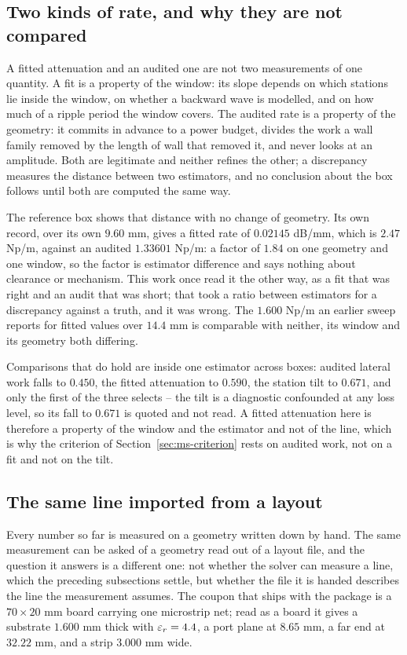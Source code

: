 \subsection{Two kinds of rate, and why they are not compared}
\label{sec:msres-estimators}

A fitted attenuation and an audited one are not two measurements of one quantity. A fit is a property of the
window: its slope depends on which stations lie inside the window, on whether a backward wave is modelled, and on
how much of a ripple period the window covers. The audited rate is a property of the geometry: it commits in
advance to a power budget, divides the work a wall family removed by the length of wall that removed it, and
never looks at an amplitude. Both are legitimate and neither refines the other; a discrepancy measures the
distance between two estimators, and no conclusion about the box follows until both are computed the same way.

The reference box shows that distance with no change of geometry. Its own record, over its own $9.60$ mm, gives a
fitted rate of $0.02145$ dB/mm, which is $2.47$ Np/m, against an audited $1.33601$ Np/m: a factor of $1.84$ on
one geometry and one window, so the factor is estimator difference and says nothing about clearance or mechanism.
This work once read it the other way, as a fit that was right and an audit that was short; that took a ratio
between estimators for a discrepancy against a truth, and it was wrong. The $1.600$ Np/m an earlier sweep reports
for fitted values over $14.4$ mm is comparable with neither, its window and its geometry both differing.

Comparisons that do hold are inside one estimator across boxes: audited lateral work falls to $0.450$, the fitted
attenuation to $0.590$, the station tilt to $0.671$, and only the first of the three selects -- the tilt is a
diagnostic confounded at any loss level, so its fall to $0.671$ is quoted and not read. A fitted attenuation
here is therefore a property of the window and the estimator and not of the line, which is why the criterion of
Section~\ref{sec:ms-criterion} rests on audited work, not on a fit and not on the tilt.

\subsection{The same line imported from a layout}
\label{sec:msres-import}

Every number so far is measured on a geometry written down by hand. The same measurement can be asked of a
geometry read out of a layout file, and the question it answers is a different one: not whether the solver can
measure a line, which the preceding subsections settle, but whether the file it is handed describes the line the
measurement assumes. The coupon that ships with the package is a $70\times20$ mm board carrying one microstrip
net; read as a board it gives a substrate $1.600$ mm thick with $\varepsilon_r = 4.4$, a port plane at $8.65$ mm, a far
end at $32.22$ mm, and a strip $3.000$ mm wide.

